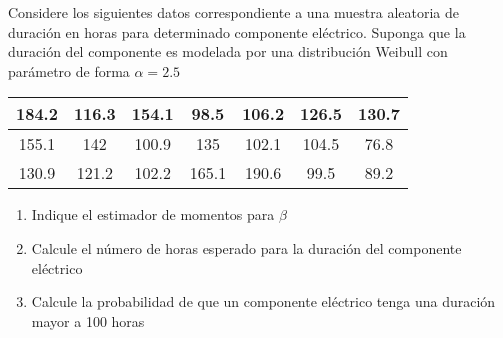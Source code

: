 \documentclass[12pt]{article}
\newenvironment{problem}[2][Problema]{\begin{trivlist}
\item[\hskip \labelsep {\bfseries #1}\hskip \labelsep {\bfseries #2.}]}{\end{trivlist}}
\begin{document}
\begin{problem}{II}
Considere los siguientes datos correspondiente a una muestra aleatoria de duración en horas para determinado componente eléctrico. Suponga que la duración del componente es modelada por una distribución Weibull con parámetro de forma $\alpha=2.5$



\begin{table}[h]
    \centering %
    \begin{tabular}{|c|c|c|c|c|c|c|} %
        \hline
        184.2 & 116.3 & 154.1 & 98.5 & 106.2 & 126.5 & 130.7 \\ \hline
        155.1 & 142 & 100.9 & 135 & 102.1 & 104.5 & 76.8 \\ \hline
        130.9 & 121.2 & 102.2 & 165.1 & 190.6 & 99.5 & 89.2 \\ \hline
    \end{tabular}
    \label{tab:duracion} %
\end{table}

\begin{enumerate}[label=\alph*)] %
    \item Indique el estimador de momentos para $\beta$
    \item Calcule el número de horas esperado para la duración del componente eléctrico
    \item Calcule la probabilidad de que un componente eléctrico tenga una duración mayor a 100 horas
\end{enumerate}


\end{problem}
\end{document}

